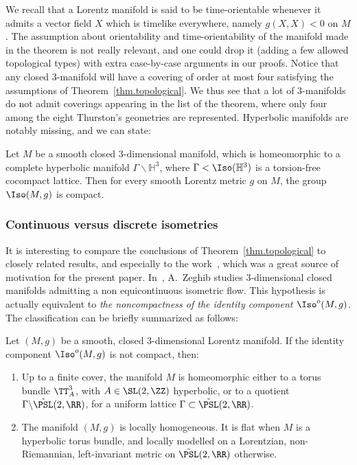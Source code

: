 We recall that a Lorentz manifold is said to be time-orientable whenever it admits a vector field $X$ which is timelike everywhere, namely $g(X,X)<0$ on $M$. The assumption about orientability and time-orientability of the manifold made in the theorem is not really relevant, and one could drop it (adding a few allowed topological types) with extra case-by-case arguments in our proofs. Notice that any closed $3$-manifold will have a covering of order at most four satisfying the assumptions of Theorem~\ref{thm.topological}. We thus see that a lot of $3$-manifolds do not admit coverings appearing in the list of the theorem, where only four among the eight Thurston's geometries are represented. Hyperbolic manifolds are notably missing, and we can state:

\begin{coro}\label{coro.hyperbolicmanifold}
Let $M$ be a smooth closed $3$-dimensional manifold, which is homeo\-morphic to a complete hyperbolic manifold $\Gamma \backslash {\mathbb H}^3$, where $\Gamma<\Iso({\mathbb H}^3)$ is a torsion-free cocompact lattice. Then for every smooth Lorentz metric $g$ on $M$, the group $\Iso(M,g)$ is compact.
\end{coro}

\subsubsection{Continuous versus discrete isometries}

It is interesting to compare the conclusions of Theorem~\ref{thm.topological} to closely related results, and especially to the work~\cite{zeghibflot}, which was a great source of motivation for the present paper. In~\cite{zeghibflot}, A.~Zeghib studies $3$-dimensional closed manifolds admitting a non equicontinuous isometric flow. This hypothesis is actually equivalent to \emph{the noncompactness of the identity component $\Iso^o(M,g)$}. The classification can be briefly summarized as follows:


\begin{theo}\cite[Theorems~1 and 2]{zeghibflot}\label{thm.ghaniclassification}
Let $(M,g)$ be a smooth, closed $3$-dimensional Lorentz manifold. If the identity component $\Iso^o(M,g)$ is not compact, then:
\begin{enumerate}
\item \label{list1.3.1} Up to a finite cover, the manifold $M$ is homeomorphic either to a torus bundle $\TT_A^3$, with $A \in \SL(2,\ZZ)$ hyperbolic, or to a quotient $\Gamma \backslash \tilde{\PSL}(2,\RR)$, for a uniform lattice $\Gamma \subset \tilde{\PSL}(2,\RR)$.
\item \label{list1.3.2}The manifold $(M,g)$ is locally homogeneous. It is flat when $M$ is a hyperbolic torus bundle, and locally modelled on a Lorentzian, non-Riemannian, left-invariant metric on $\tilde{\PSL}(2,\RR)$ otherwise.
\end{enumerate}
\end{theo}

